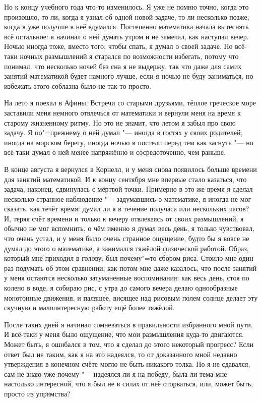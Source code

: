 Но к концу учебного года что-то изменилось.
Я уже не помню точно, когда это произошло, то ли, когда я узнал об одной новой
задаче, то ли несколько позже, когда я уже получше в неё вдумался.
Постепенно математика начала вытеснять всё остальное: я начинал о ней думать
утром и не замечал, как наступал вечер.
Ночью иногда тоже, вместо того, чтобы спать, я думал о своей задаче.
Но всё-таки ночных размышлений я старался по возможности избегать, потому что
понимал, что несколько ночей без сна я не выдержу, так что даже для самих
занятий математикой будет намного лучше, если я ночью не буду заниматься, но
избежать этого соблазна было не так-то просто.

На лето я поехал в Афины.
Встречи со старыми друзьями, тёплое греческое море заставили меня немного
отвлечься от математики и вернули меня на время к старому жизненному ритму.
Но это не значит, что летом я забыл про свою задачу.
Я по"=прежнему о ней думал "--- иногда в гостях у своих родителей, иногда на
морском берегу, иногда ночью в постели перед тем как заснуть "--- но всё-таки
думал о ней менее напряжённо и сосредоточенно, чем раньше.

В конце августа я вернулся в Корнелл, и у меня снова появилось больше времени
для занятий математикой.
И к концу сентября мне впервые стало казаться, что задача, наконец, сдвинулась с
мёртвой точки.
Примерно в это же время я сделал несколько странное наблюдение "--- задумавшись
о математике, я иногда не мог сказать, как течёт время: думал ли я в течение
получаса или нескольких часов?
И, теряя счёт времени и только к вечеру отвлекаясь от своих размышлений, я
обычно не мог вспомнить, о чём именно я думал весь день, я только чувствовал,
что очень устал, и у меня было очень странное ощущение, будто бы я вовсе не
думал до этого о математике, а занимался тяжёлой физической работой.
Образ, который мне приходил в голову, был почему"=то сбором риса.
Стоило мне один раз подумать об этом сравнении, как потом мне даже казалось, что
после занятий у меня остаются несколько затуманенные воспоминания: как весь день,
стоя по колено в воде, я собираю рис, с утра до самого вечера делаю однообразные
монотонные движения, и палящее, висящее над рисовым полем солнце делает эту
скучную и малоинтересную работу ещё более тяжёлой.

После таких дней я начинал сомневаться в правильности избранного мной пути.
И всё-таки у меня было ощущение, что мои размышления куда-то двигаются.
Может быть, я ошибался в том, что я сделал до этого некоторый прогресс?
Если ответ был не таким, как я на это надеялся, то от доказанного мной недавно
утверждения в конечном счёте могло не быть никакого толка.
Но я не сдавался, сам не знаю уже почему "--- надеялся ли я на победу, была ли
тема мне настолько интересной, что я был не в силах от неё оторваться, или,
может быть, просто из упрямства?

